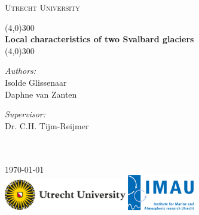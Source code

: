 \documentclass[11pt]{report}
\begin{document}
\begin{titlepage}
	\begin{center}
	\vspace*{0\textheight}
	{\scshape\LARGE Utrecht University \par} 
	\vspace{1cm} 
	\line(4,0){300}
	\vspace{0.5cm} \\
	{\Large \bfseries Local characteristics of two Svalbard glaciers\\}
	\vspace{0.5cm}
	\line(4,0){300} \\

	\vspace{2.5cm}
	\begin{minipage}[t]{0.4\textwidth}
	\begin{flushleft} \large
	\emph{Authors:}\\
	{Isolde Glissenaar}\\
	{Daphne van Zanten} \\
	\end{flushleft}
	\end{minipage} %
	\begin{minipage}[t]{0.4\textwidth}
	\begin{flushright} \large
	\emph{Supervisor:} \\
	{Dr. C.H. Tijm-Reijmer}\\
	\end{flushright}
	\end{minipage}\\[0.4cm]

	\vspace{7.5cm}
	\large \textit{}\\[1cm]

	{\large {\today}\\[2cm] %

	\noindent
	\includegraphics[scale=1, width=0.4\textwidth]{UU-logo.jpg}
	\hspace{0.2\textwidth}
	\includegraphics[scale=1, width=0.22\textwidth]{imau.png}}
	\end{center}
\end{titlepage}
\end{document}
